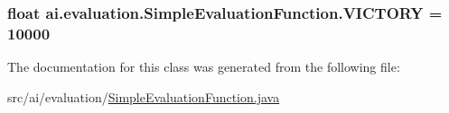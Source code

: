\label{classai_1_1evaluation_1_1_simple_evaluation_function_aac0348c46516798b458d605aef5103c2}
\hypertarget{classai_1_1evaluation_1_1_simple_evaluation_function_a28bdf717b30e4142dc9c03aa0150f355}{
\subsubsection[{VICTORY}]{\setlength{\rightskip}{0pt plus 5cm}float {\bf ai.evaluation.SimpleEvaluationFunction.VICTORY} = 10000}}
\label{classai_1_1evaluation_1_1_simple_evaluation_function_a28bdf717b30e4142dc9c03aa0150f355}


The documentation for this class was generated from the following file:\begin{DoxyCompactItemize}
\item 
src/ai/evaluation/\hyperlink{_simple_evaluation_function_8java}{SimpleEvaluationFunction.java}\end{DoxyCompactItemize}

